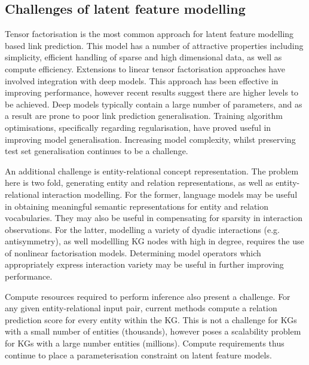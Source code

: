 \subsection{Challenges of latent feature modelling} 

Tensor factorisation is the most common approach for latent feature modelling based link prediction. This model has a number of attractive properties including simplicity, efficient handling of sparse and high dimensional data, as well as compute efficiency. Extensions to linear tensor factorisation approaches have involved integration with deep models. This approach has been effective in improving performance, however recent results suggest there are higher levels to be achieved. Deep models typically contain a large number of parameters, and as a result are prone to poor link prediction generalisation. Training algorithm optimisations, specifically regarding regularisation, have proved useful in improving model generalisation. Increasing model complexity, whilst preserving test set generalisation continues to be a challenge. \par

\noindent An additional challenge is entity-relational concept representation. The problem here is two fold, generating entity and relation representations, as well as entity-relational interaction modelling. For the former, language models may be useful in obtaining meaningful semantic representations for entity and relation vocabularies. They may also be useful in compensating for sparsity in interaction observations. For the latter, modelling a variety of dyadic interactions (e.g. antisymmetry), as well modellling KG nodes with high in degree, requires the use of nonlinear factorisation models. Determining model operators which appropriately express interaction variety may be useful in further improving performance. \par

\noindent Compute resources required to perform inference also present a challenge. For any given entity-relational input pair, current methods compute a relation prediction score for every entity within the KG. This is not a challenge for KGs with a small number of entities (thousands), however poses a scalability problem for KGs with a large number entities (millions). Compute requirements thus continue to place a parameterisation constraint on latent feature models. 



